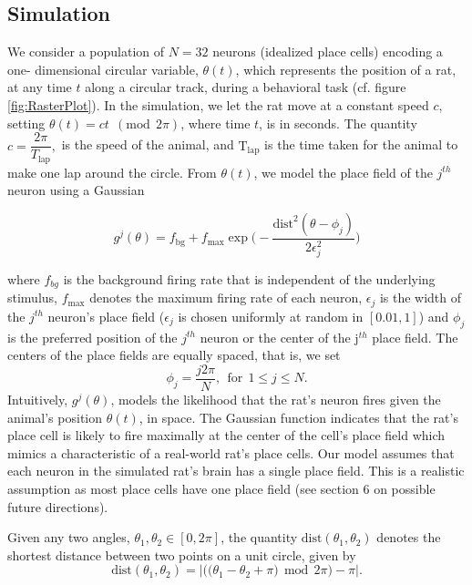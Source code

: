 \subsection{Simulation}
We consider a population of $N=32$ neurons (idealized place cells) encoding a one-
dimen\-sional circular  variable, $\theta(t)$, which represents 
the position of a rat, at any time $t$ along a circular track, during a behavioral task  (cf.  figure \ref{fig:RasterPlot}).
In the simulation, we let the rat move at a constant speed $c$, setting  $\theta(t) = c t \ \ (\text{mod} \ \ 2\pi)$, where time $t$, is in seconds. The quantity  $c = \dfrac{2\pi}{T_{\text{lap}}},$ is the speed of the animal, and
$\text{T}_{\text{lap}}$ is the time taken for the animal to make one lap around the circle.
From  $\theta(t)$,  we model the place field of the $j^{th}$ neuron using a Gaussian 

\begin{equation}
{g}^{j}(\theta) = \displaystyle  f_{\text{bg}} + f_{\max} 
\exp\bigg(-\dfrac{\text{dist}^{2}(\theta - \phi_{j})}{2\epsilon_{j}^{2}} \bigg)
\end{equation}

where $f_{bg}$ is the background firing rate that is independent of the underlying stimulus, $f_{\max}$ denotes the maximum firing rate of each neuron, $\epsilon_j $  is the width of the $j^{th}$ neuron's place field ($\epsilon_j$ is chosen uniformly at random in  $[0.01, 1]$)  and $\phi_{j}$ is the preferred position of the $j^{th}$  neuron or the center of the j$^{th}$ place field. The centers of the place fields are equally spaced, that is, we set
$$\phi_j = \frac{j2\pi}{N}, \ \    \text{for}   \ \    1 \leq j \leq N.$$
Intuitively, $g^{j}(\theta)$, models  the likelihood that the rat's neuron fires given the animal's position $\theta(t)$, in space.
The Gaussian function indicates that the rat's place cell is  likely to fire maximally  at the center of the cell's place field
which mimics a characteristic  of a real-world rat's place cells.
Our model assumes that each neuron in the simulated rat's brain has a single place field. This is a realistic assumption as 
most place cells have one place field (see section 6 on possible future directions). 


Given any two angles, $\theta_{1}, \theta_{2} \in [0, 2\pi]$, the quantity
$\text{dist}(\theta_{1}, \theta_{2})$ denotes the shortest distance between 
two points on a unit circle, given by
\[
\text{dist}(\theta_{1}, \theta_{2}) =  \left | \big( \big( \theta_{1} - \theta_{2} + \pi  \big) \ \ \text{mod} \ \ 2\pi \big) - \pi \right|.
\]

